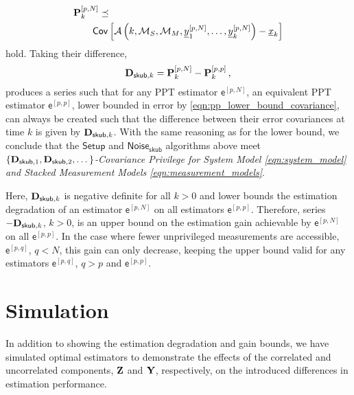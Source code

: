 \documentclass[conference]{IEEEtran}
\theoremstyle{definition}
\theoremstyle{remark}
\begin{document}
\begin{equation}\label{eqn:pN_cov_bound}
  \begin{split}
    &\mat{P}_k^{[p,N]} \preceq\\
    &\qquad \mathsf{Cov}\left[\mathcal{A}\left(k,\mathcal{M}_S,\mathcal{M}_M,\vec{y}_1^{[p,N]},\dots,\vec{y}_k^{[p,N]}\right) - \vec{x}_k\right]
  \end{split}
\end{equation}
hold. Taking their difference,
\begin{equation}\label{eqn:unpriv_priv_skub_difference_series}
  \mat{D}_{\mathsf{skub},k} = \mat{P}_k^{[p,N]} - \mat{P}_k^{[p,p]}\,,
\end{equation}
produces a series such that for any PPT estimator $\mathsf{e}^{[p,N]}$, an equivalent PPT estimator $\mathsf{e}^{[p,p]}$, lower bounded in error by \eqref{eqn:pp_lower_bound_covariance}, can always be created such that the difference between their error covariances at time $k$ is given by ${{\mathbf{D}}}_{\mathsf{skub},k}$. With the same reasoning as for the lower bound, we conclude that the $\mathsf{Setup}$ and $\mathsf{Noise}_{\mathsf{skub}}$ algorithms above meet \textit{$\{{{\mathbf{D}}}_{\mathsf{skub},1},{{\mathbf{D}}}_{\mathsf{skub},2},\dots\}$-Covariance Privilege for System Model \eqref{eqn:system_model} and Stacked Measurement Models \eqref{eqn:measurement_models}}.

Here, ${{\mathbf{D}}}_{\mathsf{skub},k}$ is negative definite for all $k>0$ and lower bounds the estimation degradation of an estimator $\mathsf{e}^{[p,N]}$ on all estimators $\mathsf{e}^{[p,p]}$. Therefore, series $-{{\mathbf{D}}}_{\mathsf{skub},k}$, $k>0$, is an upper bound on the estimation gain achievable by $\mathsf{e}^{[p,N]}$ on all $\mathsf{e}^{[p,p]}$. In the case where fewer unprivileged measurements are accessible, $\mathsf{e}^{[p,q]}$, $q<N$, this gain can only decrease, keeping the upper bound valid for any estimators $\mathsf{e}^{[p,q]}$, $q>p$ and $\mathsf{e}^{[p,p]}$.

% 
%                                 
%                                 
%                                 
% 

\section{Simulation}\label{sec:sim}
In addition to showing the estimation degradation and gain bounds, we have simulated optimal estimators to demonstrate the effects of the correlated and uncorrelated components, ${{\mathbf{Z}}}$ and ${{\mathbf{Y}}}$, respectively, on the introduced differences in estimation performance.
\end{document}
